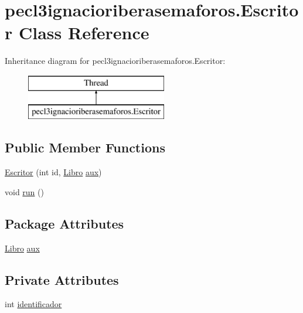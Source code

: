 \hypertarget{classpecl3ignacioriberasemaforos_1_1_escritor}{}\section{pecl3ignacioriberasemaforos.\+Escritor Class Reference}
\label{classpecl3ignacioriberasemaforos_1_1_escritor}
Inheritance diagram for pecl3ignacioriberasemaforos.\+Escritor\+:\begin{figure}[H]
\begin{center}
\leavevmode
\includegraphics[height=2.000000cm]{classpecl3ignacioriberasemaforos_1_1_escritor}
\end{center}
\end{figure}
\subsection*{Public Member Functions}
\begin{DoxyCompactItemize}
\item 
\mbox{\hyperlink{classpecl3ignacioriberasemaforos_1_1_escritor_ac8030392b7fea613a67850ab0627806f}{Escritor}} (int id, \mbox{\hyperlink{classpecl3ignacioriberasemaforos_1_1_libro}{Libro}} \mbox{\hyperlink{classpecl3ignacioriberasemaforos_1_1_escritor_acb29c7b48dcc9bf7484acf45cdc97f48}{aux}})
\item 
void \mbox{\hyperlink{classpecl3ignacioriberasemaforos_1_1_escritor_a2fdd467ba05eef92d16bcf1a2edaa67d}{run}} ()
\end{DoxyCompactItemize}
\subsection*{Package Attributes}
\begin{DoxyCompactItemize}
\item 
\mbox{\hyperlink{classpecl3ignacioriberasemaforos_1_1_libro}{Libro}} \mbox{\hyperlink{classpecl3ignacioriberasemaforos_1_1_escritor_acb29c7b48dcc9bf7484acf45cdc97f48}{aux}}
\end{DoxyCompactItemize}
\subsection*{Private Attributes}
\begin{DoxyCompactItemize}
\item 
int \mbox{\hyperlink{classpecl3ignacioriberasemaforos_1_1_escritor_a991425a23a35a53239d3c22a16eeba2d}{identificador}}
\end{DoxyCompactItemize}



